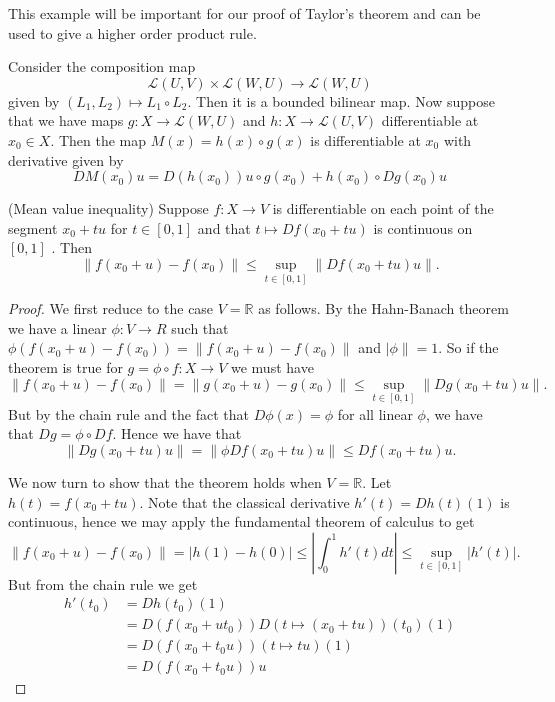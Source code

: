\documentclass[twoside, a4paper, 10pt]{amsart}
\begin{document}
This example will be important for our proof of Taylor's theorem and can be used to give a higher order product rule.
\begin{eg} \label{product rule for compositions} Consider the composition map $$ \mathcal{L}(U,V) \times \mathcal{L}(W, U)  \to \mathcal{L}(W,U)$$ given by $(L_1, L_2) \mapsto L_1 \circ L_2$. Then it is a bounded bilinear map. Now suppose that we have maps $g: X \to \mathcal{L}(W,U)$ and $h: X \to \mathcal{L}(U,V)$ differentiable at $x_0 \in X$. Then the map $M(x) = h(x) \circ g(x)$ is differentiable at $x_0$ with derivative given by $$ DM(x_0)u = D(h(x_0))u \circ g(x_0) + h(x_0) \circ Dg(x_0)u $$ \end{eg}

\begin{lemma}(Mean value inequality) Suppose $f:X \to V$ is differentiable on each point of the segment $x_0 + tu$ for $t \in [0,1]$ and that $t \mapsto Df(x_0 + tu)$ is continuous on $[0,1]$ . Then $$\| f(x_0 + u) - f(x_0) \| \leq \sup_{t \in [0,1]} \| Df(x_0 + tu) u \|.$$ \end{lemma}

\begin{proof} We first reduce to the case $V = \mathbb{R}$ as follows. By the Hahn-Banach theorem we have a linear $\phi:V \to R$ such that $\phi (f(x_0 + u) - f(x_0)) = \| f(x_0 + u) - f(x_0) \|$ and $|\phi \| = 1$. So if the theorem is true for $g = \phi \circ f: X \to V$ we must have $$\|f(x_0+ u) -f(x_0)\| = \|g(x_0 + u) - g(x_0) \| \leq \sup_{t \in [0,1]} \| Dg(x_0 + tu) u \|.$$ But by the chain rule and the fact that $D\phi(x) = \phi$ for all linear $\phi$, we have that $Dg = \phi \circ Df$. Hence we have that $$\|Dg(x_0 +tu)u \| = \| \phi Df(x_0+tu)u \| \leq Df(x_0+tu)u.$$ 

We now turn to show that the theorem holds when $V = \mathbb{R}$. Let $h(t) = f(x_0+tu)$. Note that the classical derivative $h'(t) = Dh(t) (1)$ is continuous, hence we may apply the fundamental theorem of calculus to get $$\| f(x_0 + u) - f(x_0) \| = |h(1) - h(0)| \leq |\int_{0}^1 h'(t) dt| \leq \sup_{t \in [0,1]}|h'(t)|.$$ But from the chain rule we get
\begin{align*} h'(t_0) &= Dh(t_0)(1) \\ &= D(f(x_0 + ut_0)) D(t \mapsto (x_0 + tu))(t_0)(1) \\ &= D(f(x_0+t_0u)) (t \mapsto tu)(1) \\&=D(f(x_0+t_0u)) u  \end{align*} \end{proof}
\end{document}
